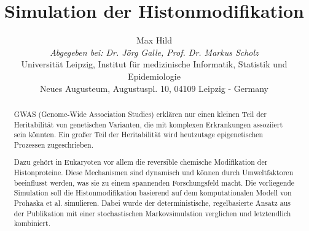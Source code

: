 \documentclass{SeminarV2}
\begin{document}
\title{Simulation der Histonmodifikation}

\author{Max Hild
\vspace{.3cm}\\
%
\emph{Abgegeben bei: Dr. J\"{o}rg Galle, Prof. Dr. Markus Scholz}
\vspace{.1cm}\\
Universit\"{a}t Leipzig, Institut f\"{u}r medizinische Informatik, Statistik und Epidemiologie\\
Neues Augusteum, Augustuspl. 10, 04109 Leipzig - Germany
}



\maketitle

\begin{abstract}
  \sloppy
  GWAS (Genome-Wide Association Studies) erklären nur einen kleinen Teil der Heritabilität von 
  genetischen Varianten, die mit komplexen Erkrankungen assoziiert sein k\"{o}nnten.
  \cite{mcclellan-2010} Ein großer Teil der Heritabilität wird heutzutage epigenetischen Prozessen
  zugeschrieben.
    
  Dazu gehört in Eukaryoten vor allem die reversible chemische Modifikation der Histonproteine. \cite{prohaska-2010}
  Diese Mechanismen sind dynamisch und k\"{o}nnen durch Umweltfaktoren beeinflusst werden, 
  was sie zu einem spannenden Forschungsfeld macht. Die vorliegende Simulation soll die 
  Histonmodifikation basierend auf dem komputationalen Modell von Prohaska et al. simulieren.
  Dabei wurde der deterministische, regelbasierte Ansatz aus der Publikation mit einer 
  stochastischen Markovsimulation verglichen und letztendlich kombiniert.
  \end{abstract}
  
\end{document}
